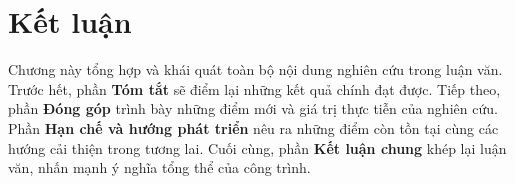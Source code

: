 
\chapter{Kết luận}

Chương này tổng hợp và khái quát toàn bộ nội dung nghiên cứu trong luận văn. 
Trước hết, phần \textbf{Tóm tắt} sẽ điểm lại những kết quả chính đạt được. 
Tiếp theo, phần \textbf{Đóng góp} trình bày những điểm mới và giá trị thực tiễn của nghiên cứu. 
Phần \textbf{Hạn chế và hướng phát triển} nêu ra những điểm còn tồn tại cùng các hướng cải thiện trong tương lai. 
Cuối cùng, phần \textbf{Kết luận chung} khép lại luận văn, nhấn mạnh ý nghĩa tổng thể của công trình. 





